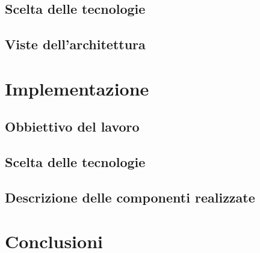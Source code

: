 \documentclass[12pt]{report}
\begin{document}
\section{Scelta delle tecnologie}
\section{Viste dell'architettura}
\chapter{Implementazione}
\section{Obbiettivo del lavoro}
\section{Scelta delle tecnologie}
\section{Descrizione delle componenti realizzate}
\chapter*{Conclusioni}
 
 
\end{document}
